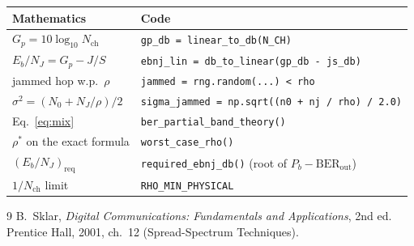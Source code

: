\documentclass[11pt,a4paper]{article}
\newcommand{\EbNJ}{E_b/N_J}
\begin{document}
\begin{center}
\begin{tabular}{@{}ll@{}}
\toprule
Mathematics & Code \\
\midrule
$G_p = 10\log_{10}N_{\mathrm{ch}}$ & \texttt{gp\_db = linear\_to\_db(N\_CH)} \\
$\EbNJ = G_p - J/S$ & \texttt{ebnj\_lin = db\_to\_linear(gp\_db - js\_db)} \\
jammed hop w.p.\ $\rho$ & \texttt{jammed = rng.random(...) < rho} \\
$\sigma^2 = (N_0 + N_J/\rho)/2$ & \texttt{sigma\_jammed = np.sqrt((n0 + nj / rho) / 2.0)} \\
Eq.~\eqref{eq:mix} & \texttt{ber\_partial\_band\_theory()} \\
$\rho^\ast$ on the exact formula & \texttt{worst\_case\_rho()} \\
$(\EbNJ)_{\mathrm{req}}$ & \texttt{required\_ebnj\_db()} (root of $P_b-\mathrm{BER}_{\mathrm{out}}$) \\
$1/N_{\mathrm{ch}}$ limit & \texttt{RHO\_MIN\_PHYSICAL} \\
\bottomrule
\end{tabular}
\end{center}

\begin{thebibliography}{9}
 B.~Sklar, \emph{Digital Communications: Fundamentals and
  Applications}, 2nd ed. Prentice Hall, 2001, ch.~12 (Spread-Spectrum
  Techniques).
\end{thebibliography}
\end{document}
